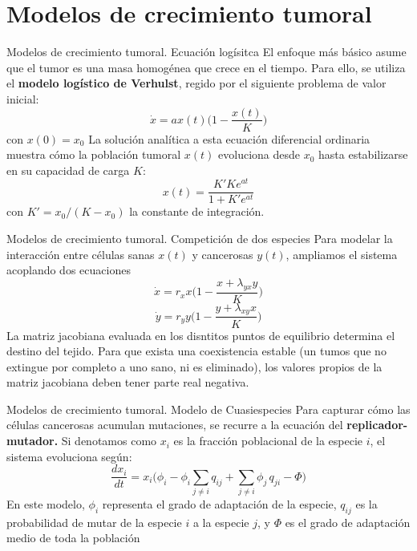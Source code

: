\documentclass{beamer}
\begin{document}
\section{Modelos de crecimiento tumoral}
\begin{frame}{Modelos de crecimiento tumoral. Ecuación logísitca}
El enfoque más básico asume que el tumor es una masa homogénea que crece en el tiempo. Para ello, se utiliza el \textbf{modelo logístico de Verhulst}, regido por el siguiente problema de valor inicial:
\begin{equation}
    \dot{x}=ax(t)\Biggl(1-\frac{x(t)}{K}\Biggl)
\end{equation}
con $x(0)=x_0$
La solución analítica a esta ecuación diferencial ordinaria muestra cómo la población tumoral $x(t)$ evoluciona desde $x_0$ hasta estabilizarse en su capacidad de carga $K$:
\begin{equation}
    x(t)=\frac{K' Ke^{at}}{1+K'e^{at}}
\end{equation}
con $K'=x_0/(K-x_0)$ la constante de integración.
\end{frame}
\begin{frame}{Modelos de crecimiento tumoral. Competición de dos especies}
Para modelar la interacción entre células sanas $x(t)$ y cancerosas $y(t)$, ampliamos el sistema acoplando dos ecuaciones
\begin{equation}
    \dot{x}=r_{x}x\Biggl(1-\frac{x+\lambda_{yx}y}{K}\Biggl)
\end{equation}
\begin{equation}
  \dot{y}=r_{y}y\Biggl(1-\frac{y+\lambda_{xy}x}{K}\Biggl)  
\end{equation}
La matriz jacobiana evaluada en los disntitos puntos de equilibrio determina el destino del tejido. Para que exista una coexistencia estable (un tumos que no extingue por completo a uno sano, ni es eliminado), los valores propios de la matriz jacobiana deben tener parte real negativa. 
\end{frame}
\begin{frame}{Modelos de crecimiento tumoral. Modelo de Cuasiespecies}
Para capturar cómo las células cancerosas acumulan mutaciones, se recurre a la ecuación del \textbf{replicador-mutador.} Si denotamos como $x_i$ es la fracción poblacional de la especie $i$, el sistema evoluciona según: 
\begin{equation}
    \frac{dx_i}{dt}=x_i\Biggl(\phi_i-\phi_i\sum_{j \neq i}q_{ij}+\sum_{j \neq i} \phi_j \,q_{ji} -\Phi \Biggl)
\end{equation}
En este modelo, $\phi_i$ representa el grado de adaptación de la especie, $q_{ij}$ es la probabilidad de mutar de la especie $i$ a la especie $j$, y $\Phi$ es el grado de adaptación medio de toda la población
\end{frame}
\end{document}

